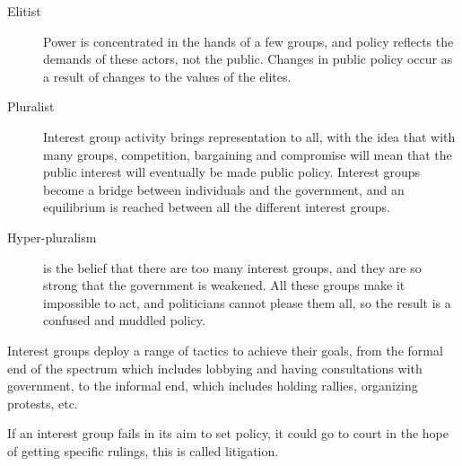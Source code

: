 
\begin{description}
  \item[Elitist] Power is concentrated in the hands of a few groups, and
    policy reflects the demands of these actors, not the public. Changes
    in public policy occur as a result of changes to the values of the
    elites.
  \item[Pluralist] Interest group activity brings representation to
    all, with the idea that with many groups, competition, bargaining
    and compromise will mean that the public interest will eventually
    be made public policy. Interest groups become a bridge between
    individuals and the government, and an equilibrium is reached
    between all the different interest groups.
  \item[Hyper-pluralism] is the belief that there are too many
    interest groups, and they are so strong that the government is
    weakened. All these groups make it impossible to act, and
    politicians cannot please them all, so the result is a confused
    and muddled policy.
\end{description}

Interest groups deploy a range of tactics to achieve their goals, from
the formal end of the spectrum which includes lobbying and having
consultations with government, to the informal end, which includes
holding rallies, organizing protests, etc.






If an interest group fails in its aim to set policy, it could go to
court in the hope of getting specific rulings, this is called
litigation.

